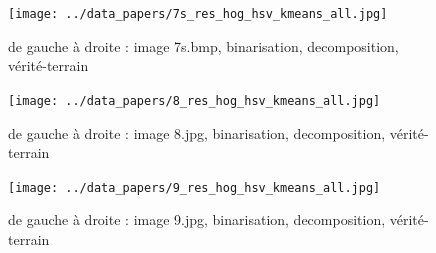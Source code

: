 \documentclass{book}
\begin{document}
\begin{figure}[H]
\begin{center}
\texttt{[image: ../data\_papers/7s\_res\_hog\_hsv\_kmeans\_all.jpg]}
\end{center}
\caption{de gauche à droite : image 7s.bmp, binarisation, decomposition, vérité-terrain}
\label{7s}
\end{figure}
\clearpage


\begin{figure}[H]
\begin{center}
\texttt{[image: ../data\_papers/8\_res\_hog\_hsv\_kmeans\_all.jpg]}
\end{center}
\caption{de gauche à droite : image 8.jpg, binarisation, decomposition, vérité-terrain}
\label{8}
\end{figure}
\clearpage


\begin{figure}[H]
\begin{center}
\texttt{[image: ../data\_papers/9\_res\_hog\_hsv\_kmeans\_all.jpg]}
\end{center}
\caption{de gauche à droite : image 9.jpg, binarisation, decomposition, vérité-terrain}
\label{9}
\end{figure}
\clearpage


\clearpage

\backmatter

\listoftables

\listoffigures



\end{document}
